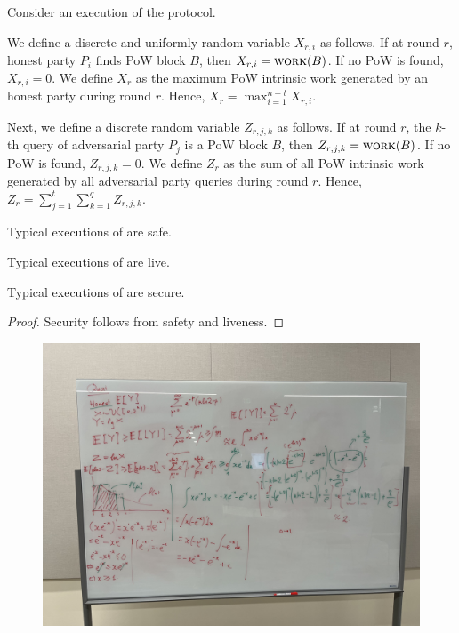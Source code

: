 Consider an execution of the \poem protocol.

We define a discrete and uniformly random variable $X_{r, i}$ as follows.
If at round $r$, honest party $P_i$ finds PoW block $B$, then $X_{r, i} = \textsc{work}(B)$.
If no PoW is found, $X_{r, i} = 0$. We define $X_{r}$ as the maximum PoW intrinsic work
generated by an honest party during round $r$. Hence, $X_{r} = \max_{i = 1}^{n - t}{X_{r,i}}$.

Next, we define a discrete random variable $Z_{r, j, k}$ as follows.
If at round $r$, the $k$-th query of adversarial party $P_j$ is a PoW block $B$, then
$Z_{r, j, k} = \textsc{work}(B)$. If no PoW is found, $Z_{r, j, k} = 0$. We define $Z_{r}$ as
the sum of all PoW intrinsic work generated by all adversarial party queries
during round $r$. Hence, $Z_{r} = \sum_{j = 1}^{t}{ \sum_{k = 1}^{q}{ Z_{r, j, k} } }$.

\begin{conjecture}
  Typical executions of \poem are safe.
\end{conjecture}

\begin{conjecture}
  Typical executions of \poem are live.
\end{conjecture}

\begin{corollary}
  Typical executions of \poem are secure.
\end{corollary}
\begin{proof}
  Security follows from safety and liveness.
  \Qed
\end{proof}

\begin{figure}[h]
    \centering
    \includegraphics[width=1\textwidth]{figures/bounds-1.jpeg}
\end{figure}

